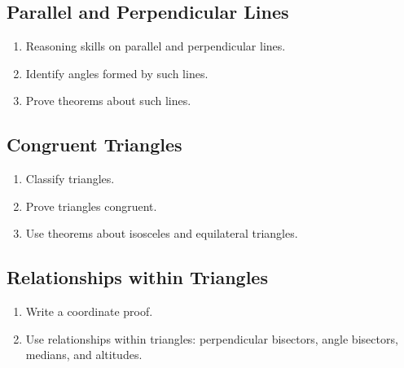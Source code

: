 \documentclass[11pt,article,oneside]{memoir}
\begin{document}
\subsection*{Parallel and Perpendicular Lines}
\begin{enumerate}
\item Reasoning skills on parallel and perpendicular lines.
\item Identify angles formed by such lines.
\item Prove theorems about such lines.
\end{enumerate}
\subsection*{Congruent Triangles}
\begin{enumerate}
\item Classify triangles.
\item Prove triangles congruent.
\item Use theorems about isosceles and equilateral triangles.
\end{enumerate}
\subsection*{Relationships within Triangles}
\begin{enumerate}
\item Write a coordinate proof.
\item Use relationships within triangles: perpendicular bisectors, angle bisectors, medians, and altitudes.
\end{enumerate}
\end{document}

